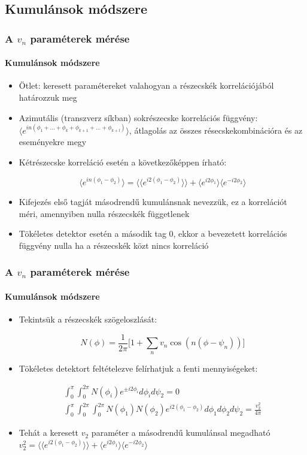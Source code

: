 \documentclass{beamer}
\begin{document}
\subsection{Kumulánsok módszere}

\begin{frame}
\frametitle{A $v_n$ paraméterek mérése}
\framesubtitle{Kumulánsok módszere}
\begin{itemize}
\item Ötlet: keresett paramétereket valahogyan a részecskék korrelációjából határozzuk meg
\item Azimutális (transzverz síkban) sokrészecske korrelációs függvény: $\langle e^{in(\phi_1+...+\phi_k+\phi_{k+1}+...+\phi_{k+l})}\rangle$, átlagolás az összes résecskekombinációra és az eseményekre megy 
\item Kétrészecske korreláció esetén a következőképpen írható:
\begin{center}
\begin{equation}
\langle e^{in(\phi_1-\phi_2)}\rangle=\langle\langle e^{i2(\phi_1-\phi_2)}\rangle\rangle+\langle e^{i2\phi_1}\rangle\langle e^{-i2\phi_2}\rangle
\end{equation}
\end{center}
\item Kifejezés első tagját másodrendű kumulánsnak nevezzük, ez a korrelációt méri, amennyiben nulla részecskék függetlenek
\item Tökéletes detektor esetén a második tag $0$, ekkor a bevezetett korrelációs függvény nulla ha a részecskék közt nincs korreláció
\end{itemize}
\end{frame}

\begin{frame}
\frametitle{A $v_n$ paraméterek mérése}
\framesubtitle{Kumulánsok módszere}
\begin{itemize}
\item Tekintsük a részecskék szögeloszlását:
\begin{center}
\begin{equation}
N(\phi)=\frac{1}{2\pi}\Big[1+\sum_{n}v_n\cos(n(\phi-\psi_n))\Big]
\end{equation}
\end{center}
\item Tökéletes detektort feltételezve felírhatjuk a fenti mennyiségeket:
\begin{center}
\begin{align}
\int_{0}^{\pi}\int_{0}^{2\pi}N(\phi_i)e^{\pm i 2\phi_i }d\phi_id\psi_2 = 0 \\
\int_{0}^{\pi}\int_{0}^{2\pi}\int_{0}^{2\pi}N(\phi_1)N(\phi_2)e^{i 2(\phi_1-\phi_2)}d\phi_1d\phi_2d\psi_2=\frac{v_2^2}{4\pi}
\end{align}
\end{center}
\item Tehát a keresett $v_2$ paraméter a másodrendű kumulánsal megadható $v_2^2=\langle\langle e^{i2(\phi_1-\phi_2)}\rangle\rangle+\langle e^{i2\phi_1}\rangle\langle e^{-i2\phi_2}\rangle$
\end{itemize}
\end{frame}
\end{document}
